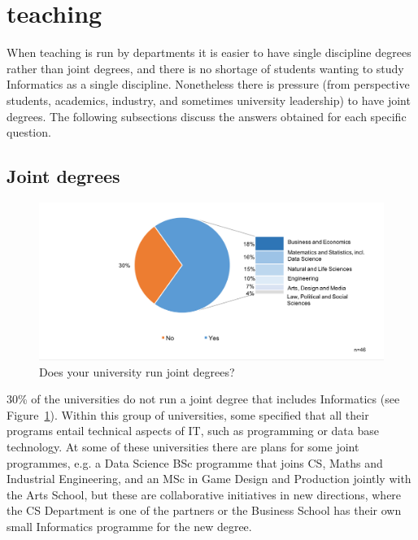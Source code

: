\section{teaching}

When teaching is run by departments it is easier to have single discipline degrees rather than joint degrees, and there is no shortage of students wanting to study Informatics as a single discipline. Nonetheless there is pressure (from perspective students, academics, industry, and sometimes university leadership) to have joint degrees. The 
following subsections discuss the answers obtained for each specific
question.

\subsection {Joint degrees}

\begin{figure}[h]
\includegraphics[width = \linewidth]{charts/2a.png}
\caption{Does your university run joint degrees?}
\label{sect3:joint}
\end{figure}

30\% of the universities do not run a joint degree that includes Informatics (see Figure~\ref{sect3:joint}). Within this group of universities, some specified that all their programs entail technical aspects of IT, such as programming or data base technology.  At some of these universities there are plans for some joint programmes, e.g. a Data Science BSc programme that joins CS, Maths and Industrial Engineering, and an MSc in Game Design and Production jointly with the Arts School, but these are collaborative initiatives in new directions, where the CS Department is one of the partners or the Business School has their own small Informatics programme for the new degree.

